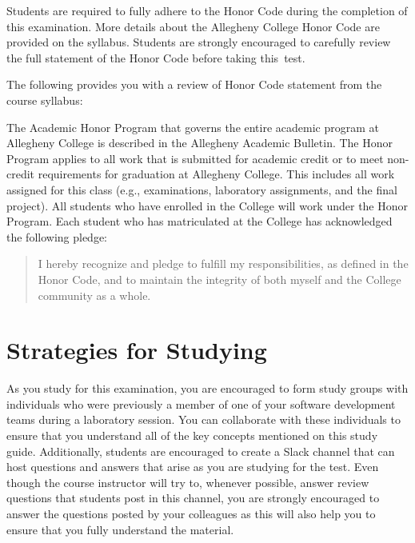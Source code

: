 \noindent Students are required to fully adhere to the Honor Code during the completion of this examination. More
details about the Allegheny College Honor Code are provided on the syllabus. Students are strongly encouraged to
carefully review the full statement of the Honor Code before taking \mbox{this test}.

\noindent The following provides you with a review of Honor Code statement from the course syllabus:

The Academic Honor Program that governs the entire academic program at Allegheny College is described in the Allegheny
Academic Bulletin.  The Honor Program applies to all work that is submitted for academic credit or to meet non-credit
requirements for graduation at Allegheny College.  This includes all work assigned for this class (e.g., examinations,
laboratory assignments, and the final project).  All students who have enrolled in the College will work under the Honor
Program.  Each student who has matriculated at the College has acknowledged the following pledge:

\vspace*{-.11in}
\begin{quote}
  I hereby recognize and pledge to fulfill my responsibilities, as defined in the Honor Code, and to maintain the
  integrity of both myself and the College community as a whole.
\end{quote}
\vspace*{-.11in}

\vspace*{-.15in}
\section*{Strategies for Studying}
\vspace*{-.05in}

As you study for this examination, you are encouraged to form study groups with individuals who were previously a
member of one of your software development teams during a laboratory session. You can collaborate with these individuals
to ensure that you understand all of the key concepts mentioned on this study guide. Additionally, students are
encouraged to create a Slack channel that can host questions and answers that arise as you are studying for the test.
Even though the course instructor will try to, whenever possible, answer review questions that students post in this
channel, you are strongly encouraged to answer the questions posted by your colleagues as this will also help you to
ensure that you fully understand the material.


